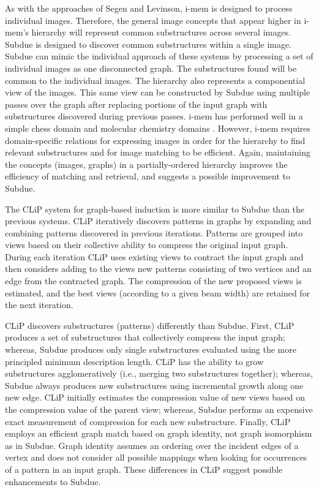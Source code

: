 As with the approaches of Segen and Levinson, {\sc i-mem} is designed to
process individual images.  Therefore, the general image concepts that
appear higher
in {\sc i-mem}'s hierarchy will represent common substructures across
several images.  {\sc Subdue} is designed to discover common substructures
within a single image.  {\sc Subdue} can mimic the individual approach of
these systems by processing a set of individual images as one disconnected
graph.  The substructures found will be common to the individual images.
The hierarchy also represents a componential view of the images.  This same
view can be constructed by {\sc Subdue} using multiple passes over the
graph after replacing portions of the input graph with substructures
discovered during previous passes.  {\sc i-mem} has performed well in a
simple chess domain and molecular chemistry domains
\cite{conklin/mlw92}.  However, {\sc i-mem} requires domain-specific
relations for expressing images in order for the hierarchy to find relevant
substructures and for image matching to be efficient.  Again, maintaining
the concepts (images, graphs) in a partially-ordered hierarchy improves the
efficiency of matching and retrieval, and suggests a possible improvement
to {\sc Subdue}.

The {\sc CLiP} system \cite{yoshida/ijcai93} for graph-based induction is
more similar to {\sc Subdue} than the previous systems.  {\sc CLiP}
iteratively discovers patterns in graphs by expanding and combining
patterns discovered in previous iterations.  Patterns are grouped into
views based on their collective ability to compress the original input
graph.  During each iteration {\sc CLiP} uses existing views to contract
the input graph and then considers adding to the views new patterns
consisting of two vertices and an edge from the contracted graph.  The
compression of the new proposed views is estimated, and the best views
(according to a given beam width) are retained for the next iteration.

{\sc CLiP} discovers substructures (patterns) differently than {\sc
Subdue}.  First, {\sc CLiP} produces a set of substructures that
collectively compress the input graph; whereas, {\sc Subdue} produces only
single substructures evaluated using the more principled minimum
description length.  {\sc CLiP} has the ability to grow substructures
agglomeratively (i.e., merging two substructures together); whereas, {\sc
Subdue} always produces new substructures using incremental growth along
one new edge.  {\sc CLiP} initially estimates the compression value of new
views based on the compression value of the parent view; whereas, {\sc
Subdue} performs an expensive exact measurement of compression for each new
substructure.  Finally, {\sc CLiP} employs an efficient graph match based
on graph identity, not graph isomorphism as in {\sc Subdue}.  Graph
identity assumes an ordering over the incident edges of a vertex and does
not consider all possible mappings when looking for occurrences of a
pattern in an input graph.  These differences in {\sc CLiP} suggest
possible enhancements to {\sc Subdue}.

